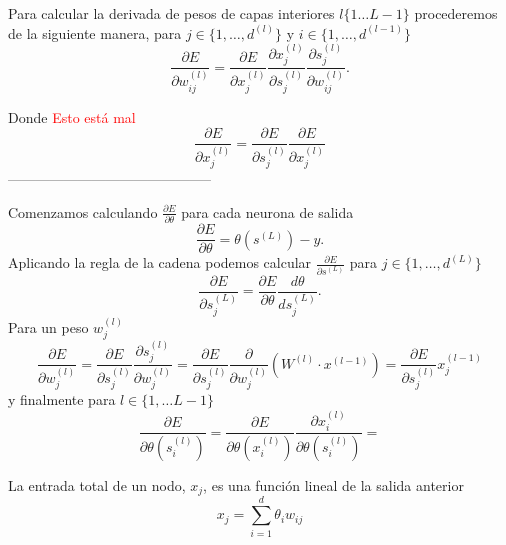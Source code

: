 Para calcular la derivada de pesos de capas interiores $l \{1 \ldots L-1\}$
procederemos de la siguiente manera, para 
$j \in \{1, \ldots , d^{(l)}\}$ y 
$i \in \{1, \ldots , d^{(l-1)}\}$ 
\begin{equation}
    \frac{\partial{E}}{\partial w^{(l)}_{i j}}
     = 
     \frac{\partial{E}}{\partial x^{(l)}_j} 
     \frac{\partial x^{(l)}_j}{\partial s^{(l)}_j} 
     \frac{\partial s^{(l)}_j}{\partial w^{(l)}_{i j}}.
\end{equation}

Donde  \textcolor{red}{Esto está mal}
\begin{equation}\label{eq:backpropagation_E_capa_intermedia_derivada}
    \frac{\partial{E}}{\partial x^{(l)}_j} 
    =
    \frac{\partial{E}}{\partial s^{(l)}_j} 
    \frac{\partial{E}}{\partial x^{(l)}_j} 
 \end{equation}
--------------------------------------------


Comenzamos calculando $\frac{\partial E}{\partial \theta}$ para cada neurona de salida 
\begin{equation}
    \frac{\partial E}{\partial \theta} 
    = 
    \theta \left(s^{(L)}\right) - y.
\end{equation}
Aplicando la regla de la cadena podemos calcular $\frac{\partial E}{\partial s^{(L)}}$
para $j \in \{1,\ldots, d^{(L)}\}$
\begin{equation}
    \frac{\partial E}{\partial s^{(L)}_j} = 
    \frac{\partial E}{\partial \theta}
    \frac{d \theta}{d s^{(L)}_j}.
\end{equation}
Para un peso $w^{(l)}_j$
\begin{equation}
    \frac{\partial{E}}{\partial w^{(l)}_j}
     = 
     \frac{\partial{E}}{\partial s^{(l)}_j} 
     \frac{\partial s^{(l)}_j}{\partial w^{(l)}_j} 
    =
    \frac{\partial{E}}{\partial s^{(l)}_j} 
    \frac{\partial }{\partial w^{(l)}_j} 
        \left(W^{(l)} \cdot x^{(l-1)}\right)
    = 
    \frac{\partial{E}}{\partial s^{(l)}_j} x^{(l-1)}_j
\end{equation}
y finalmente para $l \in \{1, \ldots L-1\}$ 
\begin{equation}
    \frac{\partial E}{\partial \theta \left( s^{(l)}_i \right)}
    = 
    \frac{\partial E}{\partial \theta \left(x^{(l)}_i\right)}
    \frac{\partial x^{(l)}_i }{\partial \theta \left(s^{(l)}_i\right)}
    = 
\end{equation}

La entrada total de un nodo, $x_j$, es una función lineal de la salida anterior
\begin{equation}
    x_j = \sum_{i=1}^{d} \theta_i w_{ij}
\end{equation}

